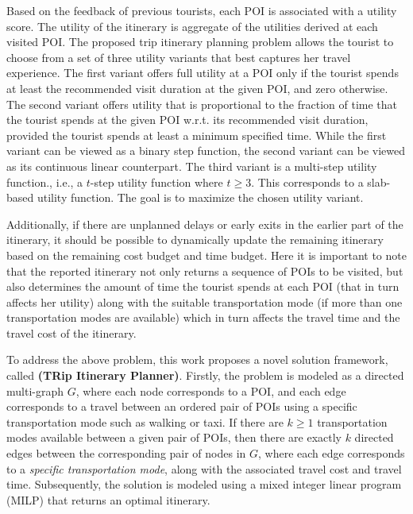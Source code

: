 Based on the feedback of previous tourists, each POI is associated with a utility score. 
The utility of the itinerary is aggregate of the utilities derived at each visited POI. The proposed trip itinerary planning problem allows the tourist to choose from a set of three utility variants that best captures her travel experience. The first variant offers full utility at a POI only if the tourist spends at least the recommended visit duration at the given POI, and zero otherwise. The second variant offers utility that is proportional to the fraction of time that the tourist spends at the given POI w.r.t. its recommended visit duration, provided the tourist  spends at least a minimum specified time. While the first variant can be viewed as a binary step function, the second variant can be viewed as its continuous linear counterpart. The third variant is a multi-step utility function., i.e., a $t$-step utility function where $t \ge 3$. This corresponds to a slab-based utility function. The goal is to maximize the chosen utility variant.

Additionally, if there are unplanned delays or early exits in the earlier part of the itinerary, it should be possible to dynamically update the remaining itinerary based on the remaining cost budget and time budget. Here it is important to note that the reported itinerary not only returns a sequence of POIs to be visited, but also determines the amount of time the tourist spends at each POI (that in turn affects her utility) along with the suitable transportation mode (if more than one transportation modes are available) which in turn affects the travel time and the travel cost of the itinerary.

To address the above problem, this work proposes a novel solution framework,  called \textbf{\trip (TRip Itinerary Planner)}.  Firstly, the problem is modeled as a directed multi-graph $G$, where each node corresponds to a POI, and each edge corresponds to a travel between an ordered pair of POIs using a specific transportation mode such as walking or taxi. If there are $k \ge 1$ transportation modes available between a given pair of POIs, then there are exactly $k$ directed edges between the corresponding pair of nodes in $G$, where each edge corresponds to a \emph{specific transportation mode}, along with the associated travel cost and travel time. Subsequently, the solution is modeled using a mixed integer linear program (MILP) that returns an optimal itinerary. 

